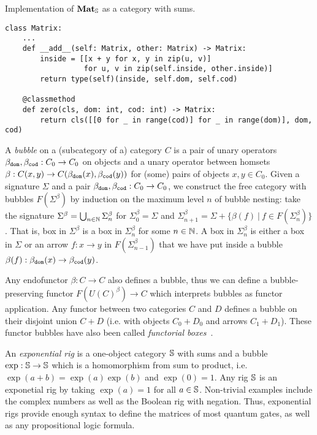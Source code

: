 \begin{python}
{\normalfont Implementation of $\mathbf{Mat}_\S$ as a category with sums.}

\begin{verbatim}
class Matrix:
    ...
    def __add__(self: Matrix, other: Matrix) -> Matrix:
        inside = [[x + y for x, y in zip(u, v)]
                  for u, v in zip(self.inside, other.inside)]
        return type(self)(inside, self.dom, self.cod)

    @classmethod
    def zero(cls, dom: int, cod: int) -> Matrix:
        return cls([[0 for _ in range(cod)] for _ in range(dom)], dom, cod)
\end{verbatim}
\end{python}

A \emph{bubble} on a (subcategory of a) category $C$ is a pair of unary operators $\beta_\dom, \beta_\cod : C_0 \to C_0$ on objects and a unary operator between homsets $\beta : C(x, y) \to C(\beta_\dom(x), \beta_\cod(y))$ for (some) pairs of objects $x, y \in C_0$.
Given a signature $\Sigma$ and a pair $\beta_\dom, \beta_\cod : C_0 \to C_0$, we construct the free category with bubbles $F(\Sigma^\beta)$ by induction on the maximum level $n$ of bubble nesting: take the signature $\Sigma^\beta = \bigcup_{n \in \N} \Sigma^\beta_n$
for $\Sigma^\beta_0 = \Sigma$ and $\Sigma^\beta_{n + 1} = \Sigma + \{ \beta(f) \ \vert \ f \in F(\Sigma^\beta_n) \}$.
That is, box in $\Sigma^\beta$ is a box in $\Sigma^\beta_{n}$ for some $n \in \N$.
A box in $\Sigma^\beta_{n}$ is either a box in $\Sigma$ or an arrow $f : x \to y$ in $F(\Sigma^\beta_{n - 1})$ that we have put inside a bubble $\beta(f) : \beta_\dom(x) \to \beta_\cod(y)$.

\begin{example}\label{example:endofunctor-bubbles}
Any endofunctor $\beta : C \to C$ also defines a bubble, thus we can define a bubble-preserving functor $F(U(C)^\beta) \to C$ which interprets bubbles as functor application.
Any functor between two categories $C$ and $D$ defines a bubble on their disjoint union $C + D$ (i.e. with objects $C_0 + D_0$ and arrows $C_1 + D_1$).
These functor bubbles have also been called \emph{functorial boxes}~\cite{Mellies06}.
\end{example}

\begin{example}
An \emph{exponential rig} is a one-object category $\S$ with sums and a bubble $\exp : \S \to \S$ which is a homomorphism from sum to product, i.e. $\exp(a + b) = \exp(a) \exp(b)$ and $\exp(0) = 1$.
Any rig $\S$ is an exponetial rig by taking $\exp(a) = 1$ for all $a \in \S$.
Non-trivial examples include the complex numbers as well as the Boolean rig with negation.
Thus, exponential rigs provide enough syntax to define the matrices of most quantum gates, as well as any propositional logic formula.
\end{example}

